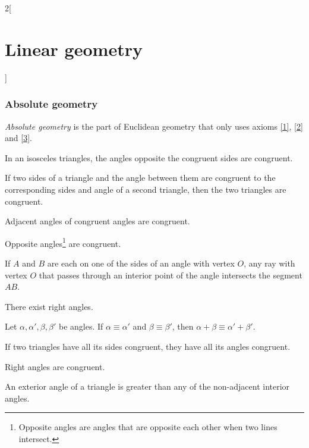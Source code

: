 \documentclass[../../../main.tex]{subfiles}
\begin{document}
\begin{multicols}{2}[\section{Linear geometry}]
    \subsubsection*{Absolute geometry}
    \begin{definition}
        \textit{Absolute geometry} is the part of Euclidean geometry that only uses axioms \ref{1}, \ref{2} and \ref{3}.
    \end{definition}
    \begin{theorem}
        In an isosceles triangles, the angles opposite the congruent sides are congruent.
    \end{theorem}
    \begin{theorem}
        If two sides of a triangle and the angle between them are congruent to the corresponding sides and angle of a second triangle, then the two triangles are congruent.
    \end{theorem}
    \begin{theorem}
        Adjacent angles of congruent angles are congruent.
    \end{theorem}
    \begin{theorem}
        Opposite angles\footnote{Opposite angles are angles that are opposite each other when two lines intersect.} are congruent.
    \end{theorem}
    \begin{theorem}
        If $A$ and $B$ are each on one of the sides of an angle with vertex $O$, any ray with vertex $O$ that passes through an interior point of the angle intersects the segment $AB$.
    \end{theorem}
    \begin{theorem}
        There exist right angles.
    \end{theorem}
    \begin{theorem}
        Let $\alpha,\alpha',\beta,\beta'$ be angles. If $\alpha\equiv\alpha'$ and $\beta\equiv\beta'$, then $\alpha+\beta\equiv\alpha'+\beta'$.
    \end{theorem}
    \begin{theorem}
        If two triangles have all its sides congruent, they have all its angles congruent.
    \end{theorem}
    \begin{theorem}
        Right angles are congruent.
    \end{theorem}
    \begin{theorem}
        An exterior angle of a triangle is greater than any of the non-adjacent interior angles.

\end{theorem}
\end{multicols}
\end{document}
